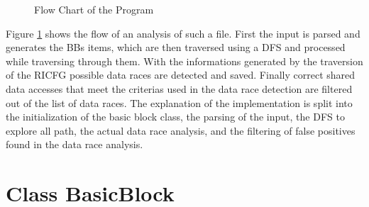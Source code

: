 \documentclass[
fancyheadings, %
%
%
]{stsreprt}
\begin{document}
{\begin{figure}[H]
	\caption{Flow Chart of the Program}
	\label{programflowchart}
\end{figure}
Figure \ref{programflowchart} shows the flow of an analysis of such a file. First the input is parsed and generates the \aclp{BB} items, which are then traversed using a \ac{DFS} and processed while traversing through them. With the informations generated by the traversion of the \ac{RICFG} possible data races are detected and saved. Finally correct shared data accesses that meet the criterias used in the data race detection are filtered out of the list of data races.
The explanation of the implementation is split into the initialization of the basic block class, the parsing of the input, the \acl{DFS} to explore all path, the actual data race analysis, and the filtering of false positives found in the data race analysis.


\section{Class BasicBlock}

}
\end{document}
